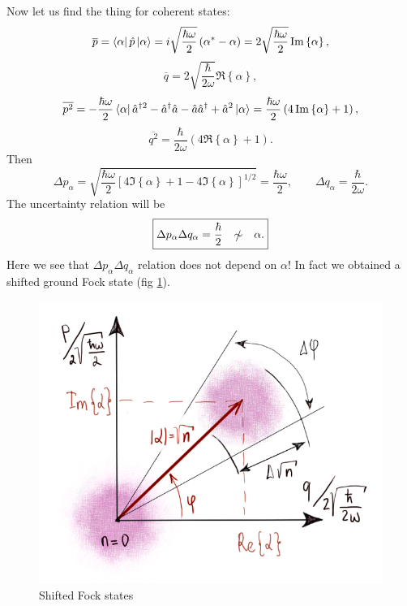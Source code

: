 Now let us find the thing for coherent states:
\begin{equation}
	\overline{p} = \left\langle {\alpha} \right\rvert \hat{p} \left\lvert {\alpha} \right\rangle = i \sqrt{\frac{\hbar \omega}{2}} \left( \alpha^* - \alpha \right) = 2 \sqrt{\frac{\hbar \omega}{2}} \operatorname{Im} \left\{ \alpha \right\},
\end{equation}
\begin{equation}
	\overline{q} = 2 \sqrt{\frac{\hbar }{2\omega}} \Re \left\{\alpha \right\},
\end{equation}
\begin{equation}
	\overline{p^2} = - \frac{\hbar \omega}{2} \left\langle {\alpha} \right\rvert \hat{a}^{\dagger 2} - \hat{a}^{\dagger} \hat{a} - \hat{a} \hat{a}^{\dagger} + \hat{a}^2  \left\lvert {\alpha} \right\rangle = \frac{\hbar \omega}{2} \left( 4 \operatorname{Im} \left\{ \alpha \right\} + 1\right),
\end{equation}
\begin{equation}
	\overline{q^2} = \frac{\hbar}{2 \omega} \left( 4 \Re \left\{ \alpha \right\} + 1\right).
\end{equation}
Then
\begin{equation}
	\Delta p_{\alpha} = \sqrt{\frac{\hbar \omega}{2} \left[ 4 \Im \left\{ \alpha \right\} + 1 - 4 \Im \left\{ \alpha \right\} \right]^{1/2}} = \frac{\hbar \omega}{2}, \qquad \Delta q_{\alpha} = \frac{\hbar}{2 \omega}.
\end{equation}
The uncertainty relation will be
\begin{equation}
	\boxed{\Delta p_{\alpha} \Delta q_{\alpha} = \frac{\hbar}{2} \quad \slashed{\sim} \quad  \alpha.}
\end{equation}
Here we see that $\Delta p_{\alpha} \Delta q_{\alpha}$ relation does not depend on $\alpha$! In fact we obtained a shifted ground Fock state (fig \ref{fig:shifted_Fock}).

\begin{figure}
	\centering
	\includegraphics[width=0.6\linewidth]{fig/L2/shifted_Fock1}
	\caption{Shifted Fock states}
	\label{fig:shifted_Fock}
\end{figure}

